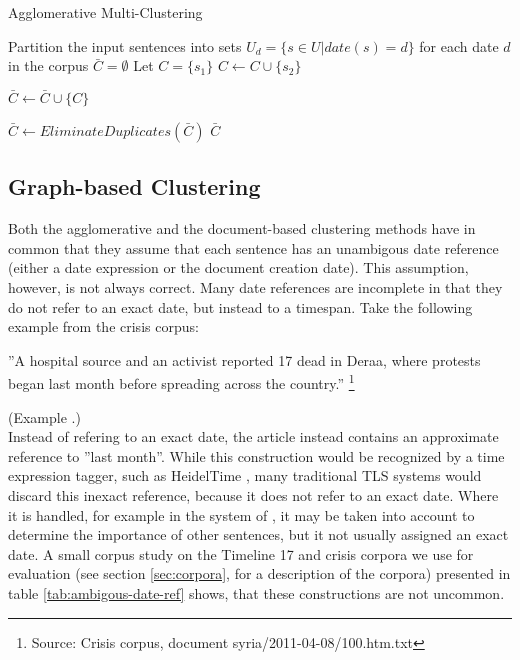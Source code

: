 \documentclass[a4paper,BCOR=10mm]{report}
\newcounter{quotecount}[chapter]
\newcommand{\countquote}[1]{\vspace{1cm}\refstepcounter{quotecount}%
     \parbox{9cm}{#1}\hspace*{1cm}(Example \thechapter.\arabic{quotecount})\\[1cm]}
\numberwithin{lemma}{chapter}
\numberwithin{definition}{chapter}
\begin{document}
 \begin{algorithm}
 \caption{Agglomerative Multi-Clustering}
 \label{alg:multi-clustering}
 \begin{algorithmic}
    \STATE Partition the input sentences into sets $U_d = \{ s \in U | date(s) = d \}$ for each date $d$ in the corpus
    \STATE $\bar{C} = \emptyset$
            \STATE Let $C = \{  s_1 \}$
                    \STATE $C \leftarrow C \cup \{ s_2 \}$
                \ENDIF
            \ENDFOR

                \STATE $\bar{C} \leftarrow \bar{C} \cup \{ C \}$
            \ENDIF
        \ENDFOR

    \ENDFOR
    \STATE $\bar{C} \leftarrow \mathit{EliminateDuplicates}(\bar{C})$
    \RETURN $\bar{C}$

\end{algorithmic}
\end{algorithm}


\subsection{Graph-based Clustering}

Both the agglomerative and the document-based clustering methods have in common that they assume that each sentence has an unambigous date reference (either a date expression or the document creation date).
This assumption, however, is not always correct. Many date references are incomplete in that they do not refer to an exact date, but instead to a timespan. Take the following example from the crisis corpus:

\countquote{
''A hospital source and an activist reported 17 dead in Deraa, where protests began last month before spreading across the country.'' \footnote{Source: Crisis corpus, document syria/2011-04-08/100.htm.txt}
\label{quot:hospital}
}
Instead of refering to an exact date, the article instead contains an approximate reference to ''last month''. While this construction would be recognized by a time expression tagger, such as HeidelTime \citep{heideltime}, many traditional TLS systems would discard this inexact reference, because it does not refer to an exact date.
Where it is handled, for example in the system of \citet{chieu}, it may be taken into account to determine the importance of other sentences, but it not usually assigned an exact date.
A small corpus study on the Timeline 17 and crisis corpora we use for evaluation (see section \ref{sec:corpora}, for a description of the corpora) presented in table \ref{tab:ambigous-date-ref} shows, that these constructions are not uncommon.
\end{document}

